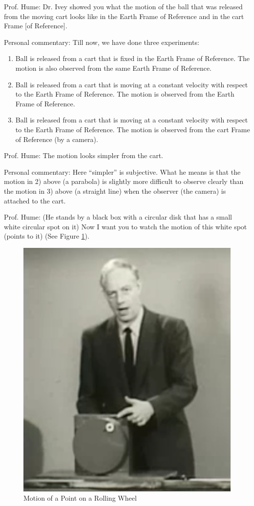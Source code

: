 \documentclass[a6paper]{article}
\newcommand{\perscom}[1]{
    {\footnotesize Personal commentary:  #1}
}
\begin{document}
Prof. Hume: Dr. Ivey showed you what the motion of the ball that was released from the moving cart looks like in the Earth Frame of Reference and in the cart Frame [of Reference].

\perscom{ Till now, we have done three experiments:}
\begin{enumerate}
    \item \label{item: exp1} Ball is released from a cart that is fixed in the Earth Frame of Reference. The motion is also observed from the same Earth Frame of Reference.
    \item \label{item: exp2} Ball is released from a cart that is moving at a constant velocity with respect to the Earth Frame of Reference. The motion is observed from the Earth Frame of Reference.
    \item \label{item: exp3} Ball is released from a cart that is moving at a constant velocity with respect to the Earth Frame of Reference. The motion is observed from the cart Frame of Reference (by a camera).
\end{enumerate}

Prof. Hume: The motion looks simpler from the cart. 

\perscom{ Here ``simpler'' is subjective. What he means is that the motion in 2) above (a parabola) is slightly more difficult to observe clearly than the motion in 3) above (a straight line) when the observer (the camera) is attached to the cart.}

Prof. Hume: (He stands by a black box with a circular disk that has a small white circular spot on it) Now I want you to watch the motion of this white spot (points to it) (See Figure \ref{fig: prof-hume-cycloid-1}).
        \begin{figure}[h!]
            \centering
            \includegraphics[width=0.7\linewidth]{prof-hume-cycloid-1.png}
            \caption{Motion of a Point on a Rolling Wheel}
            \label{fig: prof-hume-cycloid-1}
        \end{figure}
\end{document}
